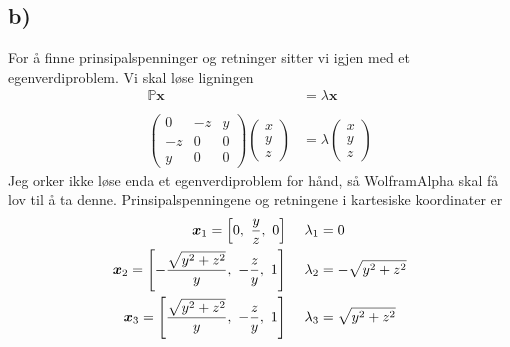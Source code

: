 \documentclass[12p,a4paper]{article}
\renewcommand{\b}{\boldsymbol}
\newcommand{\m}{\mathbb}
\newcommand{\xvec}{\begin{pmatrix} x\\y\\z \end{pmatrix}}
\begin{document}
\subsection*{b)}
For å finne prinsipalspenninger og retninger sitter vi igjen med et egenverdiproblem. Vi skal løse ligningen
\begin{align*}
    \m P\b x &= \lambda\b x \\ \\
    \begin{pmatrix}
        0  &  -z  &  y \\
        -z  &  0  &  0 \\
        y  &  0  &  0
    \end{pmatrix}
    \xvec &= \lambda\xvec
\end{align*}
Jeg orker ikke løse enda et egenverdiproblem for hånd, så WolframAlpha skal få lov til å ta denne. Prinsipalspenningene og retningene i kartesiske koordinater er
\begin{align*}
    \b x_1 = \qty[0,\ \frac{y}{z},\ 0]& \ \ \ \ \lambda_1 = 0 \\
    \b x_2 = \qty[-\frac{\sqrt{y^2+z^2}}{y},\ -\frac{z}{y},\ 1]& \ \ \ \ \lambda_2 = -\sqrt{y^2+z^2} \\
    \b x_3 = \qty[\frac{\sqrt{y^2+z^2}}{y},\ -\frac{z}{y},\ 1]& \ \ \ \ \lambda_3 = \sqrt{y^2+z^2}
\end{align*}
\end{document}
